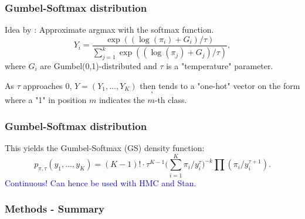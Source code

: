 \documentclass[10pt]{beamer}
\begin{document}
\begin{frame}
	\frametitle{Gumbel-Softmax distribution}
	Idea by : Approximate argmax with the softmax function. 
	\begin{equation*}
		Y_i = \frac{\exp((\log(\pi_i) + G_i)/\tau)}{\sum_{j=1}^k\exp((\log(\pi_j) + G_j)/\tau)},
	\end{equation*}
	where $G_i$ are  Gumbel(0,1)-distributed and $\tau$ is a "temperature" parameter.\pause

	As $\tau$ approaches 0, $Y = (Y_1, \dots , Y_K)$ then tends to a "one-hot" vector on the form
	\begin{equation*}
		[0, \dots, 0, 1, 0, \dots,0 ],
	\end{equation*}	
	where a "1" in position $m$ indicates the $m$-th class.
\end{frame}

\begin{frame}
	\frametitle{Gumbel-Softmax distribution}
	This yields the Gumbel-Softmax (GS) density function:
	\begin{equation*}
		p_{\pi,\tau}(y_1,\dots, y_K) = (K-1)!\cdot\tau^{K-1}\Big(\sum_{i=1}^K\pi_i/y_i^\tau\Big)^{-k}\prod(\pi_i/y_i^{\tau+1}). 
	\end{equation*}
	\textcolor{blue}{Continuous! Can hence be used with HMC and Stan.}
\end{frame}

\begin{frame}
	\frametitle{Methods - Summary}
	\begin{center}
	\end{center}
\end{frame}
\end{document}
